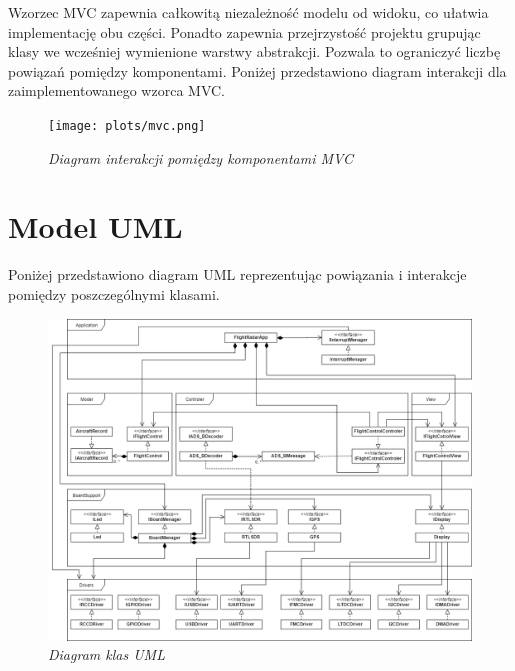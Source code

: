 \documentclass[eng,printmode]{mgr}
\begin{document}
Wzorzec MVC zapewnia całkowitą niezależność modelu od widoku, co ułatwia implementację obu części. Ponadto zapewnia przejrzystość projektu grupując klasy we wcześniej wymienione warstwy abstrakcji. Pozwala to ograniczyć liczbę powiązań pomiędzy komponentami. Poniżej przedstawiono diagram interakcji dla zaimplementowanego wzorca MVC.


\begin{center}\centering
\vspace*{\fill}
\begin{figure}[!h]
    \centering
    \texttt{[image: plots/mvc.png]}
    \caption{\textit{Diagram interakcji pomiędzy komponentami MVC}}
\end{figure}
\vfill
\end{center}

\section{Model UML}

Poniżej przedstawiono diagram UML reprezentując powiązania i interakcje pomiędzy poszczególnymi klasami.
\vskip 0.55cm
\begin{figure}[!h]
    \centering
    \includegraphics[height=\textwidth, angle=90]{plots/uml.png}
    \caption{\textit{Diagram klas UML}}
\end{figure}
\end{document}
